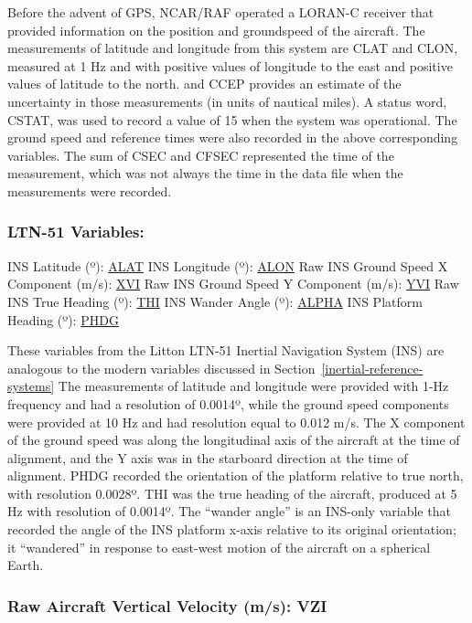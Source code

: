 \documentclass[
  english,
]{book}
\begin{document}
Before the advent of GPS, NCAR/RAF operated a LORAN-C receiver that provided information on the position and groundspeed of the aircraft. The measurements of latitude and longitude from this system are CLAT and CLON, measured at 1 Hz and with positive values of longitude to the east and positive values of latitude to the north. and CCEP provides an estimate of the uncertainty in those measurements (in units of nautical miles). A status word, CSTAT, was used to record a value of 15 when the system was operational. The ground speed and reference times were also recorded in the above corresponding variables. The sum of CSEC and CFSEC represented the time of the measurement, which was not always the time in the data file when the measurements were recorded.

\hypertarget{ltn51}{%
\subsubsection*{LTN-51 Variables:}\label{ltn51}}

INS Latitude ({º}): \underline{ALAT}
INS Longitude ({º}): \underline{ALON}
Raw INS Ground Speed X Component (m/s): \underline{XVI}
Raw INS Ground Speed Y Component (m/s): \underline{YVI}
Raw INS True Heading ({º}): \underline{THI}
INS Wander Angle ({º}): \underline{ALPHA}
INS Platform Heading ({º}): \underline{PHDG}

These variables from the Litton LTN-51 Inertial Navigation System (INS) are analogous to the modern variables discussed in Section~\ref{inertial-reference-systems} The measurements of latitude and longitude were provided with 1-Hz frequency and had a resolution of 0.0014{º}, while the ground speed components were provided at 10 Hz and had resolution equal to 0.012 m/s. The X component of the ground speed was along the longitudinal axis of the aircraft at the time of alignment, and the Y axis was in the starboard direction at the time of alignment. PHDG recorded the orientation of the platform relative to true north, with resolution 0.0028{º}. THI was the true heading of the aircraft, produced at 5 Hz with resolution of 0.0014{º}. The ``wander angle'' is an INS-only variable that recorded the angle of the INS platform x-axis relative to its original orientation; it ``wandered'' in response to east-west motion of the aircraft on a spherical Earth.

\hypertarget{vzi}{%
\subsubsection*{Raw Aircraft Vertical Velocity (m/s): VZI}\label{vzi}}
\end{document}
